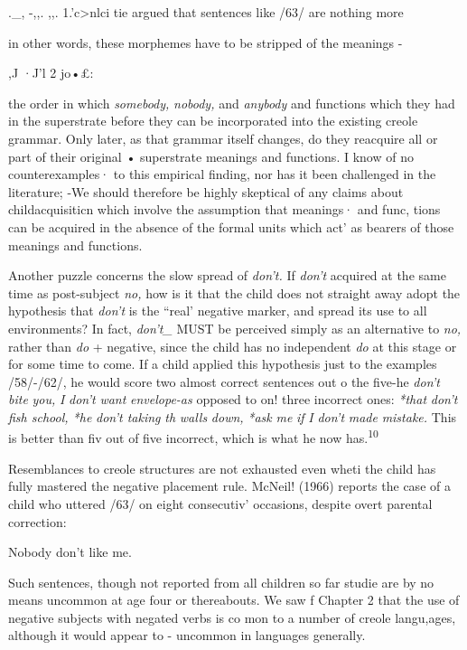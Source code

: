 .\_, {}-,,. ,,. 1.'c{\textgreater}nlci tie argued that sentences like /63/ are nothing more

in other words, these morphemes have to be stripped of the meanings -

,J ·J'l 2 jo•£:

the order in which \textit{somebody,} \textit{nobody,} and \textit{anybody}
and functions which they had in the superstrate before they can be
incorporated into the existing creole grammar. Only later, as that grammar itself changes, do they reacquire all or part of their original • superstrate meanings and functions. I know of no counterexamples· to this empirical finding, nor has it been challenged in the literature; {}-\-We should therefore be highly skeptical of any claims about child\-acquisiticn which involve the assumption that meanings· and func, tions can be acquired in the absence of the formal units which act' as bearers of those meanings and functions.

Another puzzle concerns the slow spread of \textit{don't.} If \textit{don't} acquired at the same time as post-subject \textit{no,} how is it that the child does not straight away adopt the hypothesis that \textit{don't }is the ``real' negative marker, and spread its use to all environments? In fact, \textit{don't\_} MUST be perceived simply as an alternative to \textit{no,} rather than \textit{do} + negative, since the child has no independent \textit{do} at this stage or for some time to come. If a child applied this hypothesis just to the exam\-ples /58/-/62/, he would score two almost correct sentences out o the five-he \textit{don't} \textit{bite} \textit{you,} \textit{I} \textit{don't} \textit{want} \textit{envelope-as} opposed to on! three incorrect ones: \textit{*that} \textit{don't} \textit{fish school, *he} \textit{don't taki}\textit{n}\textit{g} \textit{th} \textit{walls} \textit{down,} \textit{*ask} \textit{me} \textit{if} \textit{I} \textit{don't} \textit{made} \textit{mistake.} This is better than fiv out of five incorrect, which is what he now has.\textsuperscript{10}

Resemblances to creole structures are not exhausted even wheti the child has fully mastered the negative placement rule. McNeil! (1966) reports the case of a child who uttered /63/ on eight consecutiv' occasions, despite overt parental correction:

\ea\label{ex:63}
 Nobody don't like me.
\glt
\z

Such sentences, though not reported from all children so far studie are by no means uncommon at age four or thereabouts. We saw f Chapter 2 that the use of negative subjects with negated verbs is co mon to a number of creole langu,ages, although it would appear to {}- uncommon in languages generally.

